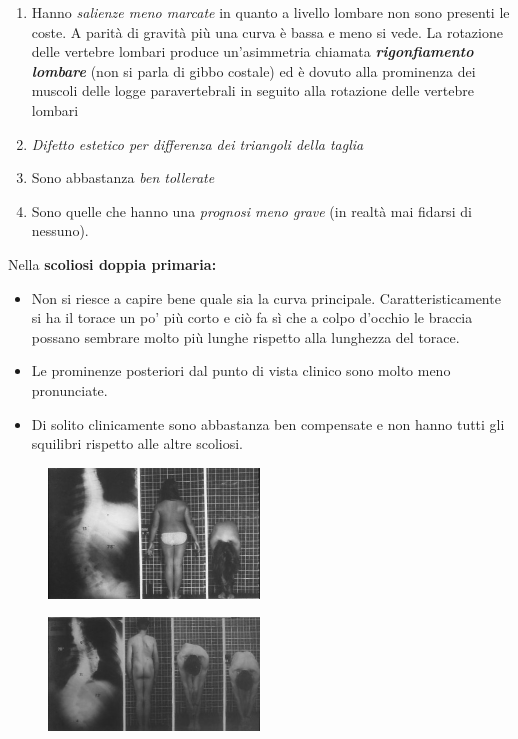 \begin{enumerate}
\def\labelenumi{\arabic{enumi}.}
\item
  Hanno \emph{salienze meno marcate} in quanto a livello lombare non
  sono presenti le coste. A parità di gravità più una curva è bassa e
  meno si vede. La rotazione delle vertebre lombari produce
  un'asimmetria chiamata \emph{\textbf{rigonfiamento lombare}} (non si
  parla di gibbo costale) ed è dovuto alla prominenza dei muscoli delle
  logge paravertebrali in seguito alla rotazione delle vertebre lombari
\item 
  \emph{Difetto estetico per differenza dei triangoli della taglia}
\item
  Sono abbastanza \emph{ben tollerate}
\item 
  Sono quelle che hanno una \emph{prognosi meno grave} (in realtà mai
  fidarsi di nessuno).
\end{enumerate}

Nella \textbf{scoliosi doppia primaria:}

\begin{itemize}
\item
  Non si riesce a capire bene quale sia la curva principale.
  Caratteristicamente si ha il torace un po' più corto e ciò fa sì che a
  colpo d'occhio le braccia possano sembrare molto più lunghe rispetto
  alla lunghezza del torace.
\item
  Le prominenze posteriori dal punto di vista clinico sono molto meno
  pronunciate.
\item
  Di solito clinicamente sono abbastanza ben compensate e non hanno
  tutti gli squilibri rispetto alle altre scoliosi.
\end{itemize}
\begin{figure}[!ht]
\centering
	\includegraphics[width=0.5\textwidth]{012/image15.jpeg}
\end{figure}
\begin{figure}[!ht]
\centering
	\includegraphics[width=0.5\textwidth]{012/image16.jpeg}
\end{figure}

